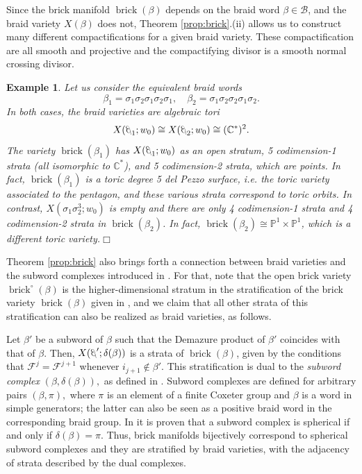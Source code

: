 \documentclass[10pt]{amsart}
\theoremstyle{plain}
\newtheorem{example}[thm]{Example}
\theoremstyle{definition}
\theoremstyle{remark}
\numberwithin{equation}{section}
\newcommand{\PP}{\mathbb{P}}
\newcommand{\bC}{\mathbb{C}}
\newcommand{\cB}{\mathcal{B}}
\newcommand{\cF}{\mathscr{F}}
\newcommand{\brick}{\operatorname{brick}}
\newcommand{\MG}[1]{{\color{teal}{{\bf Misha}: #1}}}
\DeclareRobustCommand{\ateb}{\text{\reflectbox{$\beta$}}}
\begin{document}
\noindent Since the brick manifold $\brick(\beta)$ depends on the braid word $\beta\in\cB$, and the braid variety $X(\beta)$ does not, Theorem \ref{prop:brick}.(ii) allows us to construct many different compactifications for a given braid variety. These compactification are all smooth and projective and the  compactifying divisor is a smooth normal crossing divisor.

\begin{example}
Let us consider the equivalent braid words
$$\beta_1=\sigma_1\sigma_2\sigma_1\sigma_2\sigma_1,\quad \beta_2=\sigma_1\sigma_2\sigma_2\sigma_1\sigma_2.$$
In both cases, the braid varieties are algebraic tori
$$X(\ateb_1;w_0)\cong X(\ateb_2;w_0)\cong (\bC^*)^2.$$
The variety $\brick(\beta_1)$ has $X(\ateb_1;w_0)$ as an open stratum, %
5 codimension-1 strata (all isomorphic to $\bC^*$), and 5 %
codimension-2 strata, which are points. In fact, $\brick(\beta_1)$ is a toric degree 5 del Pezzo surface, i.e. the toric variety associated to the pentagon, and these various strata correspond to toric %
orbits. In contrast, $X(\sigma_1\sigma_2^3;w_0)$ is empty and there are only 4 codimension-1 strata and 4 codimension-2 strata in $\brick(\beta_2)$. In fact, $\brick(\beta_2)\cong\PP^1\times \PP^1$, which is a different toric variety.\hfill$\Box$
\end{example}

Theorem \ref{prop:brick}  also brings forth a connection between braid varieties and the subword complexes introduced in \cite{KM}. For that, note that the open brick variety $\brick^{\circ}(\beta)$ is the higher-dimensional stratum in the stratification of the brick variety $\brick(\beta)$ given in \cite[Theorem 24]{Escobar}, and we claim that all other strata of this stratification can also be realized as braid varieties, as follows.

Let $\beta'$ be a subword of $\beta$ such that the Demazure product of $\beta'$ coincides with that of $\beta$. Then, $X(\ateb'; \delta(\beta))$ is a strata of $\brick(\beta)$, given by the conditions that $\cF^{j} = \cF^{j+1}$ whenever $i_{j+1} \not\in \beta'$. This stratification is dual to the \emph{subword complex} $(\beta, \delta(\beta)),$ as defined in \cite{KM}. Subword complexes are defined for arbitrary pairs $(\beta, \pi),$ where $\pi$ is an element of a finite Coxeter group and $\beta$ is a word in simple generators; the latter can also be seen as a positive braid word in the corresponding braid group. In \cite{KM} it is proven that a subword complex is spherical if and only if $\delta(\beta) = \pi$. Thus, brick manifolds bijectively correspond to spherical subword complexes and they are stratified by braid varieties, with the adjacency of strata described by the dual complexes.
\end{document}
